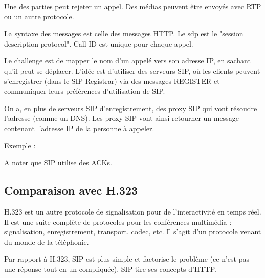 		Une des parties peut rejeter un appel. Des médias peuvent être envoyés avec RTP ou un autre protocole.
		
		
		La syntaxe des messages est celle des messages HTTP. Le sdp est le "session description protocol". Call-ID est unique pour chaque appel.
		
		Le challenge est de mapper le nom d'un appelé vers son adresse IP, en sachant qu'il peut se déplacer. L'idée est d'utiliser des serveurs SIP, où les clients peuvent s'enregistrer (dans le SIP Registrar) via des messages REGISTER et communiquer leurs préférences d'utilisation de SIP.
		
		On a, en plus de serveurs SIP d'enregistrement, des proxy SIP qui vont résoudre l'adresse (comme un DNS). Les proxy SIP vont ainsi retourner un message contenant l'adresse IP de la personne à appeler.
		
		Exemple :
		
		
		A noter que SIP utilise des ACKs.
		
			\subsection{Comparaison avec H.323}
			
			H.323 est un autre protocole de signalisation pour de l'interactivité en temps réel. Il est une suite complète de protocoles pour les conférences multimédia : signalisation, enregistrement, transport, codec, etc. Il s'agit d'un protocole venant du monde de la téléphonie.		
		
			Par rapport à H.323, SIP est plus simple et factorise le problème (ce n'est pas une réponse tout en un compliquée). SIP tire ses concepts d'HTTP.
					